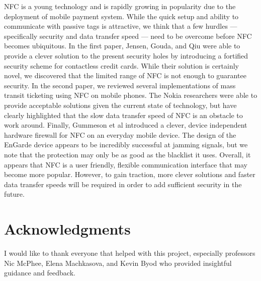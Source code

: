\documentclass{sig-alternate}
\begin{document}
NFC is a young technology and is rapidly growing in popularity due to the deployment of mobile payment system. While the quick setup and ability to communicate with passive tags is attractive, we think that a few hurdles --- specifically security and data transfer speed --- need to be overcome before NFC becomes ubiquitous. In the first paper, Jensen, Gouda, and Qiu were able to provide a clever solution to the present security holes by introducing a fortified security scheme for contactless credit cards. While their solution is certainly novel, we discovered that the limited range of NFC is not enough to guarantee security. In the second paper, we reviewed several implementations of mass transit ticketing using NFC on mobile phones. The Nokia researchers were able to provide acceptable solutions given the current state of technology, but have clearly highlighted that the slow data transfer speed of NFC is an obstacle to work around. Finally, Gummeson et al introduced a clever, device independent hardware firewall for NFC on an everyday mobile device. The design of the EnGarde device appears to be incredibly successful at jamming signals, but we note that the protection may only be as good as the blacklist it uses. Overall, it appears that NFC is a user friendly, flexible communication interface that may become more popular. However, to gain traction, more clever solutions and faster data transfer speeds will be required in order to add sufficient security in the future.

\section*{Acknowledgments}
\label{sec:acknowledgments}

I would like to thank everyone that helped with this project, especially professors Nic McPhee, Elena Machkasova, and Kevin Byod who provided insightful guidance and feedback.



\end{document}
